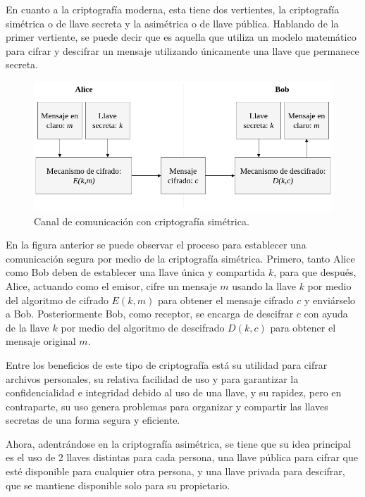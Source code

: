     En cuanto a la criptografía moderna, esta tiene dos vertientes, la
    criptografía simétrica o de llave secreta y la asimétrica o de llave
    pública. Hablando de la primer vertiente, se puede decir que es aquella
    que utiliza un modelo matemático para cifrar y descifrar un mensaje
    utilizando únicamente una llave que permanece secreta.

    \begin{figure}[H]
      \begin{center}
        \includegraphics[width=0.8\linewidth]
          {contenidos/antecedentes/intro_img/cripto_simetrica.png}
        \caption{Canal de comunicación con criptografía simétrica.}
      \end{center}
    \end{figure}

    En la figura anterior se puede observar el proceso para establecer una
    comunicación segura por medio de la criptografía simétrica. Primero, tanto
    Alice como Bob deben de establecer una llave única y compartida $k$, para
    que después, Alice, actuando como el emisor, cifre un mensaje $m$ usando
    la llave $k$ por medio del algoritmo de cifrado $E(k,m)$ para obtener el
    mensaje cifrado $c$ y enviárselo a Bob. Posteriormente Bob, como receptor,
    se encarga de descifrar $c$ con ayuda de la llave $k$ por medio del
    algoritmo de descifrado $D(k,c)$ para obtener el mensaje original $m$.

    Entre los beneficios de este tipo de criptografía está su utilidad para
    cifrar archivos personales, su relativa facilidad de uso y para garantizar
    la confidencialidad e integridad debido al uso de una llave, y su rapidez, 
    pero en contraparte, su uso genera problemas para organizar y compartir 
    las llaves secretas de una forma segura y eficiente.

    Ahora, adentrándose en la criptografía asimétrica, se tiene que su idea
    principal es el uso de 2 llaves distintas para cada persona, una llave
    pública para cifrar que esté disponible para cualquier otra persona, y una
    llave privada para descifrar, que se mantiene disponible solo para su
    propietario.

